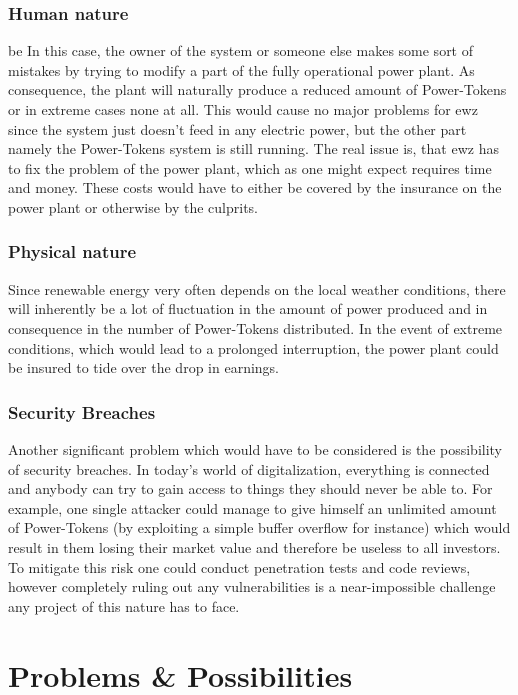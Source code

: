 \subsubsection{Human nature}be
In this case, the owner of the system or someone else makes some sort of mistakes by trying to modify a part of the fully operational power plant. As consequence, the plant will naturally produce a reduced amount of Power-Tokens or in extreme cases none at all. This would cause no major problems for ewz since the system just doesn't feed in any electric power, but the other part namely the Power-Tokens system is still running. The real issue is, that ewz has to fix the problem of the power plant, which as one might expect requires time and money. These costs would have to either be covered by the insurance on the power plant or otherwise by the culprits.

\subsubsection{Physical nature}
Since renewable energy very often depends on the local weather conditions, there will inherently be a lot of fluctuation in the amount of power produced and in consequence in the number of Power-Tokens distributed. In the event of extreme conditions, which would lead to a prolonged interruption, the power plant could be insured to tide over the drop in earnings.

\subsubsection{Security Breaches}
Another significant problem which would have to be considered is the possibility of security breaches. In today's world of digitalization, everything is connected and anybody can try to gain access to things they should never be able to. For example, one single attacker could manage to give himself an unlimited amount of Power-Tokens (by exploiting a simple buffer overflow for instance) which would result in them losing their market value and therefore be useless to all investors. To mitigate this risk one could conduct penetration tests and code reviews, however completely ruling out any vulnerabilities is a near-impossible challenge any project of this nature has to face.

\section{Problems \& Possibilities}
